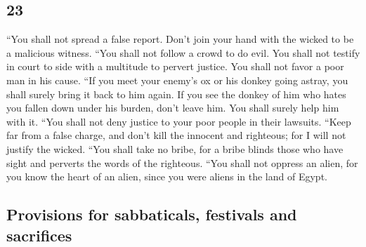 \begin{paracol}{2}
\begin{otherlanguage}{english}
\hypertarget{section-45}{%
\section{23}\label{section-45}}

 ``You shall not spread a false report. Don't join your
hand with the wicked to be a malicious witness.  ``You
shall not follow a crowd to do evil. You shall not testify in court to
side with a multitude to pervert justice.  You shall not
favor a poor man in his cause.  ``If you meet your enemy's
ox or his donkey going astray, you shall surely bring it back to him
again.  If you see the donkey of him who hates you fallen
down under his burden, don't leave him. You shall surely help him with
it.  ``You shall not deny justice to your poor people in
their lawsuits.  ``Keep far from a false charge, and don't
kill the innocent and righteous; for I will not justify the wicked.
 ``You shall take no bribe, for a bribe blinds those who
have sight and perverts the words of the righteous.  ``You
shall not oppress an alien, for you know the heart of an alien, since
you were aliens in the land of Egypt.

\hypertarget{provisions-for-sabbaticals-festivals-and-sacrifices}{%
\subsection{Provisions for sabbaticals, festivals and
sacrifices}\label{provisions-for-sabbaticals-festivals-and-sacrifices}}


\end{otherlanguage}
\end{paracol}
